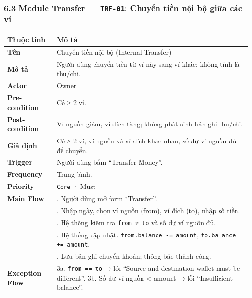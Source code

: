 \documentclass[11pt,a4paper]{article}
\newcounter{none}
\begin{document}
\subsubsection{\texorpdfstring{6.3 Module Transfer --- \texttt{TRF-01}: Chuyển tiền nội bộ giữa các ví}{6.3 Module Transfer --- TRF-01: Chuyển tiền nội bộ giữa các ví}}\label{module-transfer-trf-01-chuyux1ec3n-tiux1ec1n-nux1ed9i-bux1ed9-giux1eefa-cuxe1c-vuxed}

{\def\LTcaptype{none}
\begin{longtable}[]{@{}
  >{\raggedright\arraybackslash}p{}
  >{\raggedright\arraybackslash}p{}@{}}
\toprule\noalign{}
\begin{minipage}[b]{\linewidth}\raggedright
Thuộc tính
\end{minipage} & \begin{minipage}[b]{\linewidth}\raggedright
Mô tả
\end{minipage} \\
\midrule\noalign{}
\endhead
\bottomrule\noalign{}
\endlastfoot
\textbf{Tên} & Chuyển tiền nội bộ (Internal Transfer) \\ 
\textbf{Mô tả} & Người dùng chuyển tiền từ ví này sang ví khác; không tính là thu/chi. \\ 
\textbf{Actor} & Owner \\ 
\textbf{Pre-condition} & Có ≥ 2 ví. \\ 
\textbf{Post-condition} & Ví nguồn giảm, ví đích tăng; không phát sinh bản ghi thu/chi. \\ 
\textbf{Giả định} & Có ≥ 2 ví; ví nguồn và ví đích khác nhau; số dư ví nguồn đủ để chuyển. \\ 
\textbf{Trigger} & Người dùng bấm ``Transfer Money''. \\ 
\textbf{Frequency} & Trung bình. \\ 
\textbf{Priority} & \texttt{Core} · Must \\ 
\textbf{Main Flow} & 1. Người dùng mở form ``Transfer''.\\ 
&2. Nhập ngày, chọn ví nguồn (from), ví đích (to), nhập số tiền.\\ 
&3. Hệ thống kiểm tra \texttt{from ≠ to} và số dư ví nguồn đủ.\\
&4. Hệ thống cập nhật: \texttt{from.balance -= amount}; \texttt{to.balance += amount}.\\
&5. Lưu bản ghi chuyển khoản; thông báo thành công. \\ 
\textbf{Exception Flow} & 3a. \texttt{from == to} → lỗi ``Source and destination wallet must be different''. 3b. Số dư ví nguồn < amount → lỗi ``Insufficient balance''. \\
\end{longtable}
}
\end{document}
